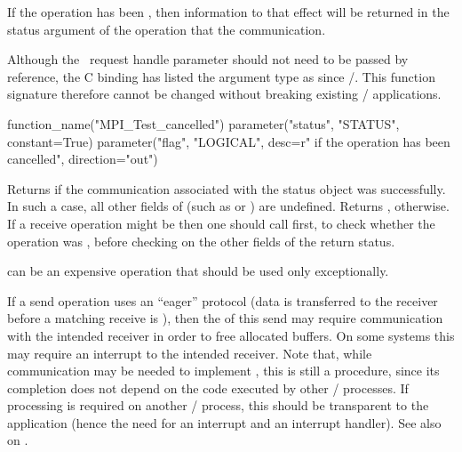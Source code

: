 If the operation has been
, then information to that effect will be returned in the
status argument of the operation that  the communication.

\begin{rationale}
Although the \IN\ request handle parameter should not need to be passed
by reference, the C binding has listed the argument type as \code{*} since
\MPIIDOTO/. This function signature therefore cannot be changed without breaking
existing \MPI/ applications.
\end{rationale}

\begin{mpi-binding}
    function_name("MPI_Test_cancelled")
    parameter("status", "STATUS", constant=True)
    parameter("flag", "LOGICAL", desc=r" if the operation has been cancelled", direction="out")
\end{mpi-binding}

Returns  if the communication associated with the
status object was  successfully.  In such a case, all
other fields of  (such as  or ) are
undefined.  Returns , otherwise.  If a receive
operation might be  then one should call 
first, to check whether the operation was
, before checking on the other fields of the return status.

\begin{users}
 can be an expensive operation that should be used only exceptionally.
\end{users}

\begin{implementors}
If a send operation uses an ``eager'' protocol (data is transferred to
the receiver
before a matching receive is ), then the  of this send
may require communication with the intended receiver in order to free
allocated
buffers.  On some systems this may require an interrupt to the
intended receiver.
Note that, while communication may be needed to implement
,
this is still a  procedure, since its completion does not
depend on the code executed by other \MPI/ processes.  If processing is required on
another \MPI/ process, this should be transparent to the application (hence the need
for an interrupt and an interrupt handler).
See also  on .
\end{implementors}

